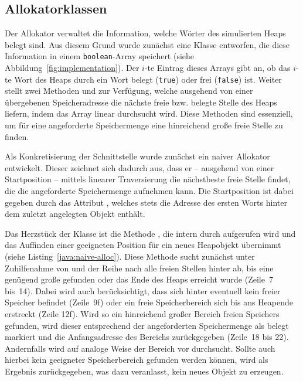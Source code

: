 \subsection{Allokatorklassen}
\label{sub:allocator}
Der Allokator verwaltet die Information, welche Wörter des simulierten Heaps belegt sind.
Aus diesem Grund wurde zunächst eine Klasse  entworfen, die diese Information in einem \texttt{boolean}-Array speichert (siehe Abbildung~\ref{fig:implementation}).
Der $i$-te Eintrag dieses Arrays gibt an, ob das $i$-te Wort des Heaps durch ein Wort belegt (\texttt{true}) oder frei (\texttt{false}) ist.
Weiter stellt  zwei Methoden  und  zur Verfügung, welche ausgehend von einer übergebenen Speicheradresse die nächste freie bzw. belegte Stelle des Heaps liefern, indem das Array linear durchsucht wird.
Diese Methoden sind essenziell, um für eine angeforderte Speichermenge eine hinreichend große freie Stelle zu finden.

Als Konkretisierung der Schnittstelle  wurde zunächst ein naiver Allokator entwickelt.
Dieser zeichnet sich dadurch aus, dass er -- ausgehend von einer Startposition -- mittels linearer Traversierung die nächstbeste freie Stelle findet, die die angeforderte Speichermenge aufnehmen kann.
Die Startposition ist dabei gegeben durch das Attribut , welches stets die Adresse des ersten Worts hinter dem zuletzt angelegten Objekt enthält.

Das Herzstück der Klasse  ist die Methode , die intern durch  aufgerufen wird und das Auffinden einer geeigneten Position für ein neues Heapobjekt übernimmt (siehe Listing~\ref{java:naive-alloc}).
Diese Methode sucht zunächst unter Zuhilfenahme von  und  der Reihe nach alle freien Stellen hinter  ab, bis eine genügend große gefunden oder das Ende des Heaps erreicht wurde (Zeile~7 bis~14).
Dabei wird auch berücksichtigt, dass sich hinter  eventuell kein freier Speicher befindet (Zeile~9f) oder ein freie Speicherbereich sich bis ans Heapende erstreckt (Zeile 12f).
Wird so ein hinreichend großer Bereich freien Speichers gefunden, wird dieser entsprechend der angeforderten Speichermenge als belegt markiert und die Anfangsadresse des Bereichs zurückgegeben (Zeile~18 bis 22).
Andernfalls wird auf analoge Weise der Bereich vor  durchsucht.
Sollte auch hierbei kein geeigneter Speicherbereich gefunden werden können, wird als Ergebnis  zurückgegeben, was  dazu veranlasst, kein neues Objekt zu erzeugen.

